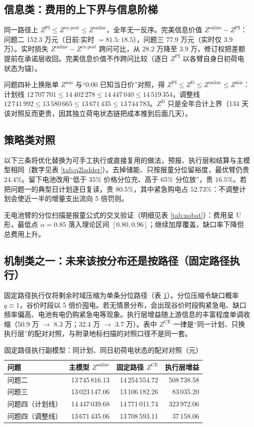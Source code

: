 \documentclass[12pt,a4paper]{ctexart}
\newcommand{\Zon}{Z^{\mathrm{online}}}
\newcommand{\ZCE}{Z^{\mathrm{CE}}}
\newcommand{\Zep}{Z^{\mathrm{ex\text{-}post}}}
\newcommand{\ZPI}{Z^{\mathrm{PI}}}
\newcommand{\ZD}{Z^{\mathrm{D}}}
\newcommand{\Zmis}{Z^{\mathrm{mis}}}
\begin{document}
\subsection{信息类：费用的上下界与信息阶梯}

同一路径上 $\ZPI\le\Zep\le\Zon$，全年无一反序。完美信息价值 $\Zon-\ZPI$：问题二 152.3 万元（日前:实时 $=81.5:18.5$），问题三 77.9 万元（实时仅 3.9 万）。实时损失 $\Zon-\Zep$ 跨问可比，从 28.2 万降至 3.9 万，修订权把差额提前在承诺层收回。完美信息价值不作跨问比较（逐日 $\ZPI$ 以各臂自身日初荷电状态为锚）。

问题四补上换账单 $\Zmis$ 与“0:00 已知当日价”对照，得 $\ZPI\le\ZD\le\Zon\le\Zmis$：计划线 $12\,707\,701\le14\,402\,278\le14\,447\,040\le14\,519\,354$，调整线 $12\,741\,992\le13\,580\,665\le13\,671\,435\le13\,744\,783$。$\ZD$ 只是全年合计上界（134 天该对照反而更贵，因其独立荷电状态链把成本推到后面几天）。

\subsection{策略类对照}

以下三条将优化替换为可手工执行或直接复用的做法，预报、执行层和结算与主模型相同（数字见表 \ref{tab:q2ladder}）。去掉储能、只按报童分位留裕度，最优臂仍贵 $24.4\%$。留下电池改用“低于 35\% 价格分位充、高于 65\% 分位放”，贵 $16.5\%$。若把问题一的典型日计划逐日复读，贵 $80.5\%$，其中紧急购电占 $52.73\%$：不调整计划会使近一半的增量支出流向 5 倍罚则。

无电池臂的分位扫描是报童公式的交叉验证（明细见表 \ref{tab:nobat}）：费用呈 U 形，最低点 $\alpha=0.85$ 落入理论区间 $[0.80,0.96]$；继续加厚覆盖，缺口率下降但总费用上升。

\subsection{机制类之一：未来该按分布还是按路径（固定路径执行）}

固定路径执行仅将剩余时域压缩为单条分位路径（表 \ref{tab:aux_ce}）。分位压缩令缺口概率 $q\equiv1$，谷价时段以 5 倍价囤电。若无情景分布，会出现谷价时段购紧急电、缺口频率偏高、电池有电仍购紧急电等现象。执行层增益随上游信息的丰富程度单调收缩（50.9 万 $\to$ 8.3 万；32.4 万 $\to$ 3.7 万）。表中 $\ZCE$ 一律是“同一计划、只换执行层”的配对对照，与附录地标扫描的对照口径不是同一套。

\begin{table}[H]
\centering\small
\caption{固定路径执行副模型：同计划、同日初荷电状态的配对对照（元）}
\begin{tabular}{lrrr}
\toprule
问题 & 主模型 $\Zon$ & 固定路径 $\ZCE$ & 执行层增益 \\
\midrule
问题二 & 13\,745\,816.13 & 14\,254\,554.72 & 508\,738.58 \\
问题三 & 13\,023\,147.06 & 13\,106\,182.26 & 83\,035.20 \\
问题四（计划线） & 14\,447\,039.68 & 14\,771\,011.74 & 323\,972.06 \\
问题四（调整线） & 13\,671\,435.06 & 13\,708\,593.11 & 37\,158.06 \\
\bottomrule
\end{tabular}
\label{tab:aux_ce}
\end{table}
\end{document}
